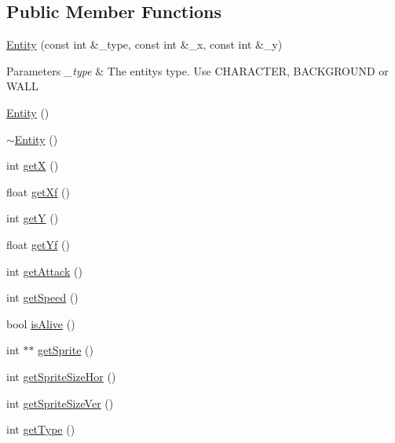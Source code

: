 \subsection*{Public Member Functions}
\begin{DoxyCompactItemize}
\item 
\hyperlink{class_entity_a87846efef623ffc48666016192c3a70a}{Entity} (const int \&\+\_\+type, const int \&\+\_\+x, const int \&\+\_\+y)
\begin{DoxyCompactList}\small\item\em 
\begin{DoxyParams}{Parameters}
{\em \+\_\+type} & The entity\textquotesingle{}s type. Use C\+H\+A\+R\+A\+C\+T\+ER, B\+A\+C\+K\+G\+R\+O\+U\+ND or W\+A\+LL\\
\hline
\end{DoxyParams}
\end{DoxyCompactList}\item 
\hyperlink{class_entity_a980f368aa07ce358583982821533a54a}{Entity} ()
\item 
\hyperlink{class_entity_adf6d3f7cb1b2ba029b6b048a395cc8ae}{$\sim$\+Entity} ()
\item 
int \hyperlink{class_entity_a8bad399d8b9c6bf23ecbb8f0b4fe6a64}{getX} ()
\item 
float \hyperlink{class_entity_a720fe132c20bef66ba4c8ea9deb01a98}{get\+Xf} ()
\item 
int \hyperlink{class_entity_a4f2a264033195f9004a494069c5865f0}{getY} ()
\item 
float \hyperlink{class_entity_a6be4857eafb366769782f25bc0e6e3f1}{get\+Yf} ()
\item 
int \hyperlink{class_entity_aae036430d4de6fcb232a6eb998347f73}{get\+Attack} ()
\item 
int \hyperlink{class_entity_a65f27075a95287e8c0f8f101498b3e84}{get\+Speed} ()
\item 
bool \hyperlink{class_entity_ab0986ba7a1b24f022b5623781050c0f1}{is\+Alive} ()
\item 
int $\ast$$\ast$ \hyperlink{class_entity_a48d3a8a239791a7a7e43c5152e7669bc}{get\+Sprite} ()
\item 
int \hyperlink{class_entity_a80c402398c390373c32f22f26c327b43}{get\+Sprite\+Size\+Hor} ()
\item 
int \hyperlink{class_entity_ad948c5a1bf88e0d3f8a226e8e0366399}{get\+Sprite\+Size\+Ver} ()
\item 
int \hyperlink{class_entity_ac54cf97ab5e7fadca07c54b1cf15a74a}{get\+Type} ()
\item 
$$
\end{DoxyCompactItemize}
